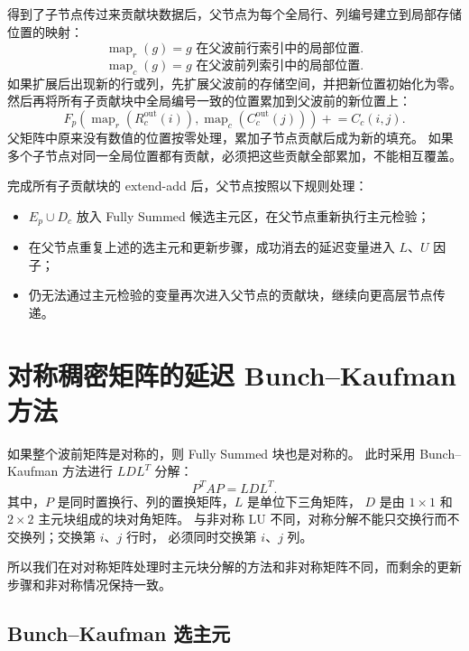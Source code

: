 得到了子节点传过来贡献块数据后，父节点为每个全局行、列编号建立到局部存储位置的映射：
$$\operatorname{map}_r(g)
=g\text{ 在父波前行索引中的局部位置}.$$
$$\operatorname{map}_c(g)
=g\text{ 在父波前列索引中的局部位置}.$$
\qquad 如果扩展后出现新的行或列，先扩展父波前的存储空间，并把新位置初始化为零。
然后再将所有子贡献块中全局编号一致的位置累加到父波前的新位置上：
$$F_p\!\left(
\operatorname{map}_r(R_c^{\mathrm{out}}(i)),
\operatorname{map}_c(C_c^{\mathrm{out}}(j))
\right)
\mathrel{+}=C_c(i,j).$$
\qquad 父矩阵中原来没有数值的位置按零处理，累加子节点贡献后成为新的填充。
如果多个子节点对同一全局位置都有贡献，必须把这些贡献全部累加，不能相互覆盖。

完成所有子贡献块的 extend-add 后，父节点按照以下规则处理：

\begin{itemize}
  \item $E_p\cup D_c$ 放入 Fully Summed 候选主元区，在父节点重新执行主元检验；
  \item 在父节点重复上述的选主元和更新步骤，成功消去的延迟变量进入 $L$、$U$ 因子；
  \item 仍无法通过主元检验的变量再次进入父节点的贡献块，继续向更高层节点传递。
\end{itemize}


\section{对称稠密矩阵的延迟 Bunch--Kaufman 方法}

如果整个波前矩阵是对称的，则 Fully Summed 块也是对称的。
此时采用 Bunch--Kaufman 方法进行 $LDL^T$ 分解：
$$P^TAP=LDL^T.$$
其中，$P$ 是同时置换行、列的置换矩阵，$L$ 是单位下三角矩阵，
$D$ 是由 $1\times1$ 和 $2\times2$ 主元块组成的块对角矩阵。
与非对称 LU 不同，对称分解不能只交换行而不交换列；交换第 $i$、$j$ 行时，
必须同时交换第 $i$、$j$ 列。

所以我们在对对称矩阵处理时主元块分解的方法和非对称矩阵不同，而剩余的更新步骤和非对称情况保持一致。
\subsection{Bunch--Kaufman 选主元}

